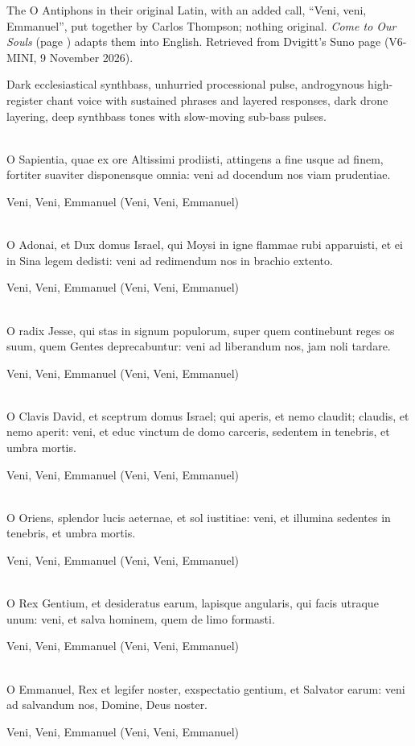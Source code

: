 
\label{sec:ero-cras}
\begin{notes}
The O Antiphons in their original Latin, with an added call, ``Veni, veni, Emmanuel'', put together by Carlos Thompson; nothing original. \emph{Come to Our Souls} (page \pageref{sec:come-to-our-souls}) adapts them into English. Retrieved from Dvigitt's Suno page (V6-MINI, 9 November 2026).
\end{notes}
\begin{style}
Dark ecclesiastical synthbass, unhurried processional pulse, androgynous high-register chant voice with sustained phrases and layered responses, dark drone layering, deep synthbass tones with slow-moving sub-bass pulses.
\end{style}
\begin{lyrics}
\\
O Sapientia, quae ex ore Altissimi prodiisti, attingens a fine usque ad finem, fortiter suaviter disponensque omnia: veni ad docendum nos viam prudentiae.

Veni, Veni, Emmanuel
(Veni, Veni, Emmanuel)

\\
O Adonai, et Dux domus Israel, qui Moysi in igne flammae rubi apparuisti, et ei in Sina legem dedisti: veni ad redimendum nos in brachio extento.

Veni, Veni, Emmanuel
(Veni, Veni, Emmanuel)

\\
O radix Jesse, qui stas in signum populorum, super quem continebunt reges os suum, quem Gentes deprecabuntur: veni ad liberandum nos, jam noli tardare.

Veni, Veni, Emmanuel
(Veni, Veni, Emmanuel)

\\
O Clavis David, et sceptrum domus Israel; qui aperis, et nemo claudit; claudis, et nemo aperit: veni, et educ vinctum de domo carceris, sedentem in tenebris, et umbra mortis.

Veni, Veni, Emmanuel
(Veni, Veni, Emmanuel)

\\
O Oriens, splendor lucis aeternae, et sol iustitiae: veni, et illumina sedentes in tenebris, et umbra mortis.

Veni, Veni, Emmanuel
(Veni, Veni, Emmanuel)

\\
O Rex Gentium, et desideratus earum, lapisque angularis, qui facis utraque unum: veni, et salva hominem, quem de limo formasti.

Veni, Veni, Emmanuel
(Veni, Veni, Emmanuel)

\\
O Emmanuel, Rex et legifer noster, exspectatio gentium, et Salvator earum: veni ad salvandum nos, Domine, Deus noster.

Veni, Veni, Emmanuel
(Veni, Veni, Emmanuel)
\end{lyrics}


